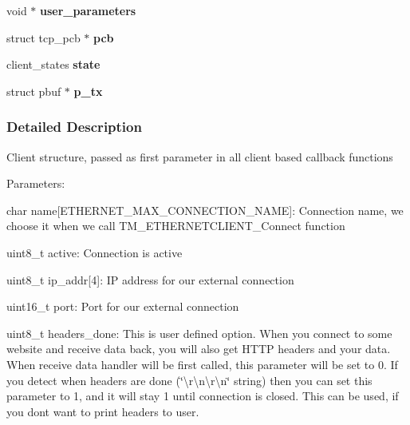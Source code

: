\begin{DoxyCompactItemize}
\item 
\hypertarget{struct_t_m___t_c_p_c_l_i_e_n_t__t_a402b1466b53a8c77e92e5f9a0883693c}{}void $\ast$ {\bfseries user\+\_\+parameters}\label{struct_t_m___t_c_p_c_l_i_e_n_t__t_a402b1466b53a8c77e92e5f9a0883693c}

\item 
\hypertarget{struct_t_m___t_c_p_c_l_i_e_n_t__t_a7d8c5f5eed3154f7848c3a2ac9a9863a}{}struct tcp\+\_\+pcb $\ast$ {\bfseries pcb}\label{struct_t_m___t_c_p_c_l_i_e_n_t__t_a7d8c5f5eed3154f7848c3a2ac9a9863a}

\item 
\hypertarget{struct_t_m___t_c_p_c_l_i_e_n_t__t_a698f457b284f988a16a150e7e2e08ed4}{}client\+\_\+states {\bfseries state}\label{struct_t_m___t_c_p_c_l_i_e_n_t__t_a698f457b284f988a16a150e7e2e08ed4}

\item 
\hypertarget{struct_t_m___t_c_p_c_l_i_e_n_t__t_a464574d4b7ed1ccdf0bfb551858c930c}{}struct pbuf $\ast$ {\bfseries p\+\_\+tx}\label{struct_t_m___t_c_p_c_l_i_e_n_t__t_a464574d4b7ed1ccdf0bfb551858c930c}

\end{DoxyCompactItemize}


\subsubsection{Detailed Description}
Client structure, passed as first parameter in all client based callback functions

Parameters\+:
\begin{DoxyItemize}
\item char name\mbox{[}E\+T\+H\+E\+R\+N\+E\+T\+\_\+\+M\+A\+X\+\_\+\+C\+O\+N\+N\+E\+C\+T\+I\+O\+N\+\_\+\+N\+A\+M\+E\mbox{]}\+: Connection name, we choose it when we call T\+M\+\_\+\+E\+T\+H\+E\+R\+N\+E\+T\+C\+L\+I\+E\+N\+T\+\_\+\+Connect function
\item uint8\+\_\+t active\+: Connection is active
\item uint8\+\_\+t ip\+\_\+addr\mbox{[}4\mbox{]}\+: I\+P address for our external connection
\item uint16\+\_\+t port\+: Port for our external connection
\item uint8\+\_\+t headers\+\_\+done\+: This is user defined option. When you connect to some website and receive data back, you will also get H\+T\+T\+P headers and your data. When receive data handler will be first called, this parameter will be set to 0. If you detect when headers are done (\char`\"{}\textbackslash{}r\textbackslash{}n\textbackslash{}r\textbackslash{}n\char`\"{} string) then you can set this parameter to 1, and it will stay 1 until connection is closed. This can be used, if you don\textquotesingle{}t want to print headers to user.
\end{DoxyItemize}

